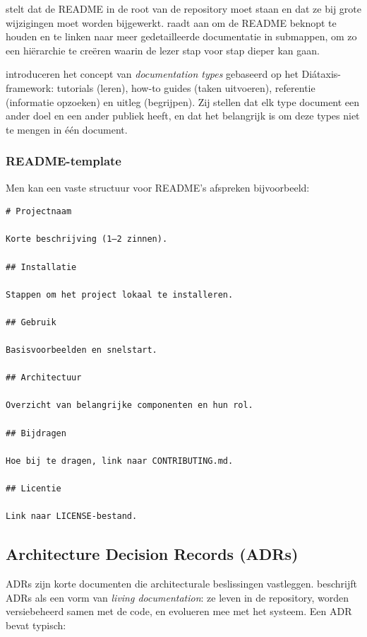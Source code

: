 \textcite{gentle2017docslikecode} stelt dat de README in de root van de repository moet staan en dat ze bij grote wijzigingen moet worden bijgewerkt. \textcite{etter2016moderntechwriting} raadt aan om de README beknopt te houden en te linken naar meer gedetailleerde documentatie in submappen, om zo een hiërarchie te creëren waarin de lezer stap voor stap dieper kan gaan.

\textcite{bhatti2021docsdevelopers} introduceren het concept van \textit{documentation types} gebaseerd op het Diátaxis-framework: tutorials (leren), how-to guides (taken uitvoeren), referentie (informatie opzoeken) en uitleg (begrijpen). Zij stellen dat elk type document een ander doel en een ander publiek heeft, en dat het belangrijk is om deze types niet te mengen in één document.

\subsubsection{README-template}
Men kan een vaste structuur voor README's afspreken bijvoorbeeld:

\begin{verbatim}
# Projectnaam

Korte beschrijving (1–2 zinnen).

## Installatie

Stappen om het project lokaal te installeren.

## Gebruik

Basisvoorbeelden en snelstart.

## Architectuur

Overzicht van belangrijke componenten en hun rol.

## Bijdragen

Hoe bij te dragen, link naar CONTRIBUTING.md.

## Licentie

Link naar LICENSE-bestand.
\end{verbatim}

\subsection{Architecture Decision Records (ADRs)}
ADRs zijn korte documenten die architecturale beslissingen vastleggen. \textcite{martraire2019livingdocumentation} beschrijft ADRs als een vorm van \textit{living documentation}: ze leven in de repository, worden versiebeheerd samen met de code, en evolueren mee met het systeem. Een ADR bevat typisch:

